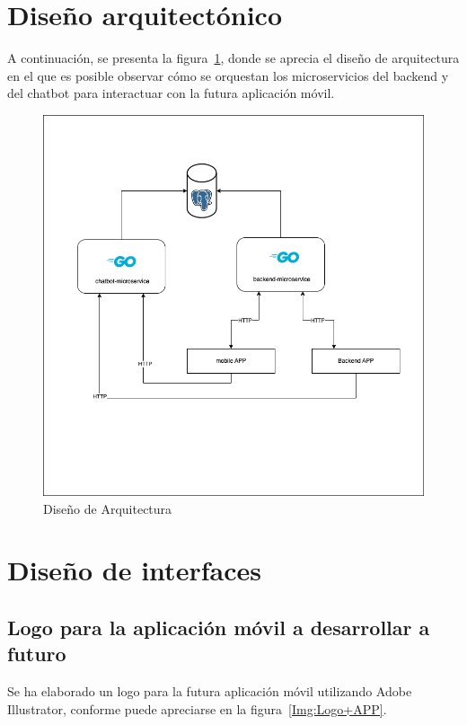 \section{Diseño arquitectónico}
A continuación, se presenta la figura~\ref{Img:Diseno+Arquitectura}, donde se aprecia el diseño de arquitectura en el que es posible observar cómo se orquestan los microservicios del backend  y del chatbot para interactuar con la futura aplicación móvil.

\begin{figure}[h]
    \centering
    \includegraphics[width=1.0\textwidth]{img/datos/microservices-TFG.drawio.png}
    \caption{Diseño de Arquitectura} \label{Img:Diseno+Arquitectura}
\end{figure} 

\newpage

\section{Diseño de interfaces}

\subsection{Logo para la aplicación móvil a desarrollar a futuro}
Se ha elaborado un logo para la futura aplicación móvil utilizando Adobe Illustrator, conforme puede apreciarse en la figura~\ref{Img:Logo+APP}.

